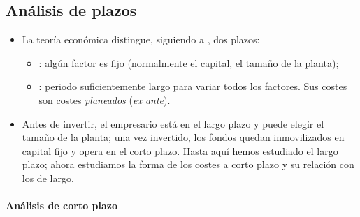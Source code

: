 \documentclass[11pt]{article}
\begin{document}
\subsection{Análisis de plazos}\label{sec:analisis-plazos}

\begin{itemize}
\item La teoría económica distingue, siguiendo a \textcite{Marshall1890Principles}, dos plazos:
  \begin{itemize}
  \item {}: algún factor es fijo (normalmente el capital, el tamaño de la planta);
  \item {}: periodo suficientemente largo para variar todos los factores. Sus costes son costes \emph{planeados} (\emph{ex ante}).
  \end{itemize}
\item Antes de invertir, el empresario está en el largo plazo y puede elegir el tamaño de la planta; una vez invertido, los fondos quedan inmovilizados en capital fijo y opera en el corto plazo. Hasta aquí hemos estudiado el largo plazo; ahora estudiamos la forma de los costes a corto plazo y su relación con los de largo.
\end{itemize}

\paragraph{Análisis de corto plazo}
\end{document}
